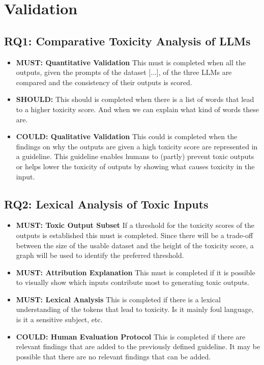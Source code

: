 \section{Validation}

\subsection{RQ1: Comparative Toxicity Analysis of LLMs}

\begin{itemize}
    \item \textbf{MUST: Quantitative Validation}
    This must is completed when all the outputs, given the prompts of the dataset [...], of the three LLMs are compared and the consistency of their outputs is scored.

    \item\textbf{SHOULD: }
    This should is completed when there is a list of words that lead to a higher toxicity score. And when we can explain what kind of words these are. 
    
    \item \textbf{COULD: Qualitative Validation}
    This could is completed when the findings on why the outputs are given a high toxicity score are represented in a guideline. This guideline enables humans to (partly) prevent toxic outputs or helps lower the toxicity of outputs by showing what causes toxicity in the input.
\end{itemize}

\subsection{RQ2: Lexical Analysis of Toxic Inputs}

\begin{itemize}
    \item \textbf{MUST: Toxic Output Subset}
    If a threshold for the toxicity scores of the outputs is established this must is completed. Since there will be a trade-off between the size of the usable dataset and the height of the toxicity score, a graph will be used to identify the preferred threshold.
    
    \item \textbf{MUST: Attribution Explanation}
    This must is completed if it is possible to visually show which inputs contribute most to generating toxic outputs.
    
    \item \textbf{MUST: Lexical Analysis}
    This is completed if there is a lexical understanding of the tokens that lead to toxicity. Is it mainly foul language, is it a sensitive subject, etc. 

    \item \textbf{COULD: Human Evaluation Protocol}
    This is completed if there are relevant findings that are added to the previously defined guideline. It may be possible that there are no relevant findings that can be added.
\end{itemize}

